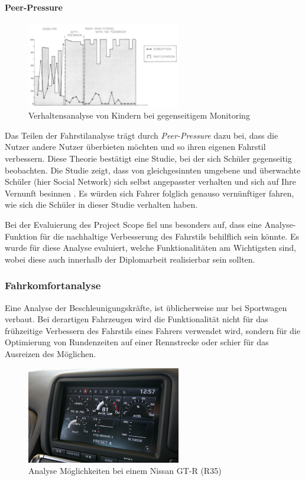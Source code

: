 \paragraph{Peer-Pressure} 
\begin{figure}\centering
    \includegraphics[width=0.6\textwidth]{images/peerPressure}
    \caption{Verhaltensanalyse von Kindern bei gegenseitigem Monitoring \cite{SIMR.CH1-fahrstil-analyse.PeerPressure}} \label{Fig:imgPeerPressure}
\end{figure}
Das Teilen der Fahrstilanalyse trägt durch \textit{Peer-Pressure}  dazu bei, dass die Nutzer andere Nutzer überbieten möchten und so ihren eigenen Fahrstil verbessern. Diese Theorie bestätigt eine Studie, bei der sich Schüler gegenseitig beobachten. Die Studie zeigt, dass von gleichgesinnten umgebene und überwachte Schüler (hier Social Network) sich selbst angepasster verhalten und sich auf Ihre Vernunft besinnen \cite{SIMR.CH1-fahrstil-analyse.PeerPressure}. Es würden sich Fahrer folglich genauso vernünftiger fahren, wie sich die Schüler in dieser Studie verhalten haben.

Bei der Evaluierung des Project Scope fiel uns besonders auf, dass eine Analyse-Funktion für die nachhaltige Verbesserung des Fahrstils behilflich sein könnte. Es wurde für diese Analyse evaluiert, welche Funktionalitäten am Wichtigsten sind, wobei diese auch innerhalb der Diplomarbeit realisierbar sein sollten.

\subsubsection{Fahrkomfortanalyse}
Eine Analyse der Beschleunigungskräfte, ist üblicherweise nur bei Sportwagen verbaut. Bei derartigen Fahrzeugen wird die Funktionalität nicht für das frühzeitige Verbessern des Fahrstils eines Fahrers verwendet wird, sondern für die Optimierung von Rundenzeiten auf einer Rennstrecke oder schier für das Ausreizen des Möglichen.

\begin{figure}[!htb]\centering
	\includegraphics[width=0.6\textwidth]{images/gtrMultifunc}
	\caption{Analyse Möglichkeiten bei einem Nissan GT-R (R35) \cite{SIMR.CH1-Fahrstil-Analyse.GTRMultifunc}}\label{Fig:imgGTR}
\end{figure}

